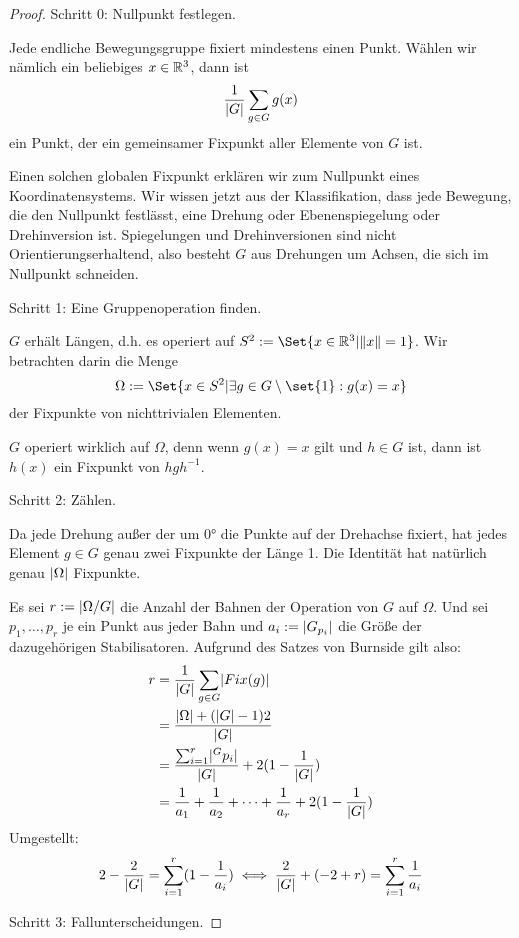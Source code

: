 \begin{proof}
Schritt 0: Nullpunkt festlegen.

Jede endliche Bewegungsgruppe fixiert mindestens einen Punkt. Wählen wir nämlich ein beliebiges $x\in\mathbb{R}^3$, dann ist
\[\frac{1}{\lvert G\rvert}\sum_{g\in G} g(x)\]
ein Punkt, der ein gemeinsamer Fixpunkt aller Elemente von $G$ ist.

Einen solchen globalen Fixpunkt erklären wir zum Nullpunkt eines Koordinatensystems. Wir wissen jetzt aus der Klassifikation, dass jede Bewegung, die den Nullpunkt festlässt, eine Drehung oder Ebenenspiegelung oder Drehinversion ist. Spiegelungen und Drehinversionen sind nicht Orientierungserhaltend, also besteht $G$ aus Drehungen um Achsen, die sich im Nullpunkt schneiden.

\medbreak
Schritt 1: Eine Gruppenoperation finden.

$G$ erhält Längen, d.h. es operiert auf $S^2:=\Set{x\in\IR^3 | \norm{x}=1}$. Wir betrachten darin die Menge
\[\Omega:=\Set{x\in S^2 | \exists g\in G\setminus\set{1}: g(x)=x}\]
der Fixpunkte von nichttrivialen Elementen.

$G$ operiert wirklich auf $\Omega$, denn wenn $g(x)=x$ gilt und $h\in G$ ist, dann ist $h(x)$ ein Fixpunkt von $hgh^{-1}$.

\medbreak
Schritt 2: Zählen.

Da jede Drehung außer der um 0° die Punkte auf der Drehachse fixiert, hat jedes Element $g\in G$ genau zwei Fixpunkte der Länge 1. Die Identität hat natürlich genau $\lvert\Omega\rvert$ Fixpunkte.

Es sei $r:=\lvert\Omega/G\rvert$ die Anzahl der Bahnen der Operation von $G$ auf $\Omega$. Und sei $p_1,\ldots,p_r$ je ein Punkt aus jeder Bahn und $a_i:=\lvert G_{p_i}\rvert$ die Größe der dazugehörigen Stabilisatoren. Aufgrund des Satzes von Burnside gilt also:
\begin{align*}
r &= \frac{1}{\lvert G\rvert}\sum_{g\in G} \lvert Fix(g)\rvert \\
&=\frac{\lvert\Omega\rvert + (\lvert G\rvert-1)2}{\lvert G\rvert} \\
&=\frac{\sum_{i=1}^r \lvert^G p_i\rvert}{\lvert G\rvert} + 2(1-\frac{1}{\lvert G\rvert}) \\
&=\frac{1}{a_1}+\frac{1}{a_2}+\cdots+\frac{1}{a_r}+2(1-\frac{1}{\lvert G\rvert})
\end{align*}
Umgestellt:
\[2-\frac{2}{\lvert G\rvert} = \sum_{i=1}^r(1-\frac{1}{a_i}) \iff \frac{2}{\lvert G\rvert}+(-2+r) =  \sum_{i=1}^r \frac{1}{a_i} \]

\medbreak
Schritt 3: Fallunterscheidungen.


\end{proof}
